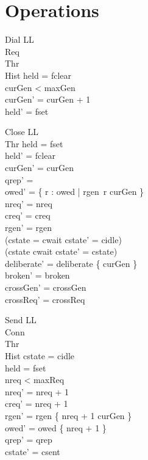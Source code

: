 \documentclass[a4paper,10pt,fleqn]{article}
\begin{document}
\section{Operations}

\begin{schema}{Dial}
  \Delta LL \\
  \Xi Req \\
  \Xi Thr \\
  \Xi Hist
\where
  held = fclear \\
  curGen < maxGen \\
  curGen' = curGen + 1 \\
  held' = fset
\end{schema}

\begin{schema}{Close}
  \Delta LL \\
  \Xi Thr
\where
  held = fset \\
  held' = fclear \\
  curGen' = curGen \\
  qrep' = \emptyset \\
  owed' = \{ r : owed | rgen~r \neq curGen \} \\
  nreq' = nreq \\
  creq' = creq \\
  rgen' = rgen \\
  (cstate = cwait \implies cstate' = cidle) \\
  (cstate \neq cwait \implies cstate' = cstate) \\
  deliberate' = deliberate \cup \{ curGen \} \\
  broken' = broken \\
  crossGen' = crossGen \\
  crossReq' = crossReq
\end{schema}

\begin{schema}{Send}
  \Delta LL \\
  \Xi Conn \\
  \Xi Thr \\
  \Xi Hist
\where
  cstate = cidle \\
  held = fset \\
  nreq < maxReq \\
  nreq' = nreq + 1 \\
  creq' = nreq + 1 \\
  rgen' = rgen \oplus \{ nreq + 1 \mapsto curGen \} \\
  owed' = owed \cup \{ nreq + 1 \} \\
  qrep' = qrep \\
  cstate' = csent
\end{schema}
\end{document}

